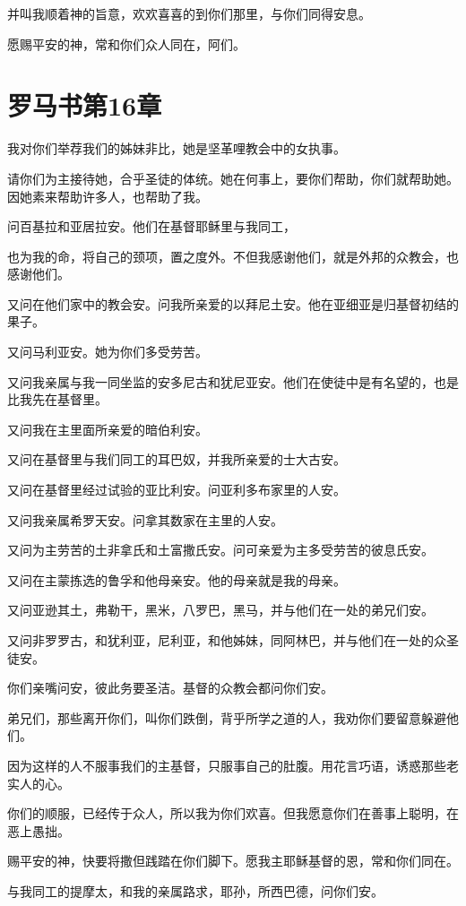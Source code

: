 \documentclass[12pt,oneside]{book}
\begin{document}
并叫我顺着神的旨意，欢欢喜喜的到你们那里，与你们同得安息。

愿赐平安的神，常和你们众人同在，阿们。

\chapter{罗马书第16章}
我对你们举荐我们的姊妹非比，她是坚革哩教会中的女执事。

请你们为主接待她，合乎圣徒的体统。她在何事上，要你们帮助，你们就帮助她。因她素来帮助许多人，也帮助了我。

问百基拉和亚居拉安。他们在基督耶稣里与我同工，

也为我的命，将自己的颈项，置之度外。不但我感谢他们，就是外邦的众教会，也感谢他们。

又问在他们家中的教会安。问我所亲爱的以拜尼土安。他在亚细亚是归基督初结的果子。

又问马利亚安。她为你们多受劳苦。

又问我亲属与我一同坐监的安多尼古和犹尼亚安。他们在使徒中是有名望的，也是比我先在基督里。

又问我在主里面所亲爱的暗伯利安。

又问在基督里与我们同工的耳巴奴，并我所亲爱的士大古安。

又问在基督里经过试验的亚比利安。问亚利多布家里的人安。

又问我亲属希罗天安。问拿其数家在主里的人安。

又问为主劳苦的土非拿氏和土富撒氏安。问可亲爱为主多受劳苦的彼息氏安。

又问在主蒙拣选的鲁孚和他母亲安。他的母亲就是我的母亲。

又问亚逊其土，弗勒干，黑米，八罗巴，黑马，并与他们在一处的弟兄们安。

又问非罗罗古，和犹利亚，尼利亚，和他姊妹，同阿林巴，并与他们在一处的众圣徒安。

你们亲嘴问安，彼此务要圣洁。基督的众教会都问你们安。

弟兄们，那些离开你们，叫你们跌倒，背乎所学之道的人，我劝你们要留意躲避他们。

因为这样的人不服事我们的主基督，只服事自己的肚腹。用花言巧语，诱惑那些老实人的心。

你们的顺服，已经传于众人，所以我为你们欢喜。但我愿意你们在善事上聪明，在恶上愚拙。

赐平安的神，快要将撒但践踏在你们脚下。愿我主耶稣基督的恩，常和你们同在。

与我同工的提摩太，和我的亲属路求，耶孙，所西巴德，问你们安。
\end{document}

